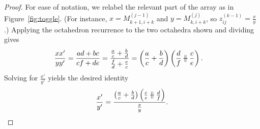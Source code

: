 \documentclass[11pt]{article}
\theoremstyle{definition}
\numberwithin{equation}{section}
\numberwithin{equation}{section}
\newcommand{\parallelsum}{\:\ \mathclap{\|}\mathclap{-}\ \:}
\begin{document}
\begin{proof} For ease of notation, we relabel the relevant part of the array as in Figure~\ref{fig:toggle}. (For instance, $x = M_{k+1,i+k}^{(j-1)}$ and $y = M_{k,i+k}^{(j)}$, so $z_{ij}^{(k-1)} = \frac{x}{y}$.) Applying the octahedron recurrence to the two octahedra shown and dividing gives
\begin{align*}
    \frac{xx'}{yy'} &= \frac{ad+bc}{cf+de} 
= \frac{\frac{a}{c} + \frac{b}{d}}{\frac{f}{d} + \frac{e}{c}}
    = \left( \frac{a}{c} + \frac{b}{d} \right) \left(\frac{d}{f} \parallelsum  \frac{c}{e} \right).  
\end{align*}
Solving for $\frac{x'}{y'}$ yields the desired identity
\[\frac{x'}{y'}=  \frac{\left( \frac{a}{c} + \frac{b}{d} \right) \left(\frac{c}{e} \parallelsum  \frac{d}{f} \right)}{\frac xy}.\qedhere\]
\end{proof}
\end{document}
